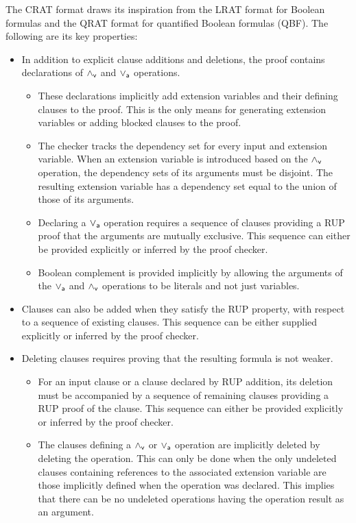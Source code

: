 \documentclass{llncs}
\newcommand{\pand}{\mathbin{\land_{\sf v}}}
\newcommand{\por}{\mathbin{\lor_{\sf a}}}
\begin{document}
The CRAT format draws its inspiration from the LRAT format for Boolean formulas and the
QRAT format for
quantified Boolean formulas (QBF).  The following are its key properties:
\begin{itemize}
  \item
  In addition to explicit clause additions and deletions, the proof contains declarations of $\pand$ and $\por$ operations.
\begin{itemize}
\item 
  These declarations implicitly add extension variables and their defining clauses to the proof.
  This is the only means for generating extension variables or adding blocked clauses to the proof.
\item The checker tracks the dependency set for every input and
  extension variable.  When an extension variable is introduced based
  on the $\pand$ operation, the dependency sets of its arguments must
  be disjoint.  The resulting extension variable has a dependency set equal to the union of those of its arguments.
\item Declaring a $\por$ operation requires a sequence of clauses
  providing a RUP proof that the arguments are mutually exclusive.  This sequence can either be provided explicitly or inferred by the proof checker.
\item Boolean complement is provided implicitly by allowing the
  arguments of the $\por$ and $\pand$ operations to be literals and not just
  variables.
\end{itemize}
\item
  Clauses can also be added when they satisfy the RUP
  property, with respect to a sequence of existing clauses.  This sequence can
  be either supplied explicitly or inferred by the proof checker.
\item
  Deleting clauses requires proving that the resulting formula is not weaker.
  \begin{itemize}
    \item For an input clause or a clause declared by RUP addition, its
      deletion must be accompanied by a sequence of remaining clauses
      providing a RUP proof of the clause.  This sequence can either
      be provided explicitly or inferred by the proof checker.
    \item The clauses defining a $\pand$ or $\por$ operation are
      implicitly deleted by deleting the operation.  This can only be
      done when the only undeleted clauses containing
      references to the associated extension variable are those
      implicitly defined when the operation was declared.
      This implies that there can be no undeleted operations having
      the operation result as an argument.
  \end{itemize}
\end{itemize}
\end{document}
